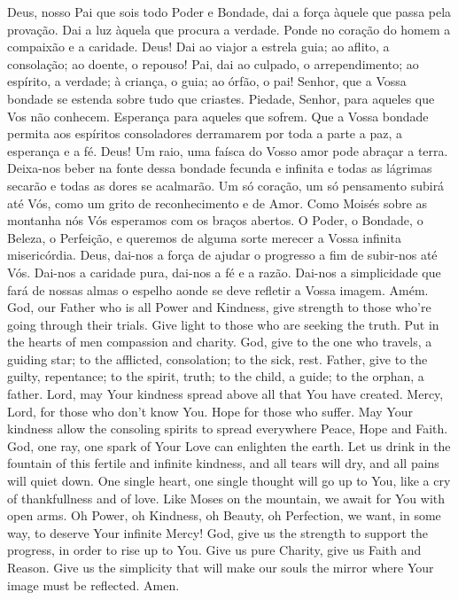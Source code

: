 \scleardpage
{}
  \beginverse
    Deus, nosso Pai que sois todo Poder e Bondade, dai
    a força àquele que passa pela provação.
    \ind Dai a luz àquela que procura a verdade.
    \ind Ponde no coração do homem a compaixão e a caridade.
    \ind Deus! Dai ao viajor a estrela guia; ao aflito,
    a consolação; ao doente, o repouso!
    \ind Pai, dai ao culpado, o arrependimento; ao espírito,
    a verdade; à criança, o guia; ao órfão, o pai!
    \ind Senhor, que a Vossa bondade se estenda sobre tudo
    que criastes.
    \ind Piedade, Senhor, para aqueles que Vos não conhecem.
    \ind Esperança para aqueles que sofrem.
    \ind Que a Vossa bondade permita aos espíritos
    consoladores derramarem por toda a parte a paz, a
    esperança e a fé.
    \ind Deus! Um raio, uma faísca do Vosso amor pode abraçar
    a terra.
    \ind Deixa-nos beber na fonte dessa bondade fecunda
    e infinita e todas as lágrimas secarão e todas as
    dores se acalmarão.
    \ind Um só coração, um só pensamento subirá até Vós,
    como um grito de reconhecimento e de Amor.
    \ind Como Moisés sobre as montanha nós Vós esperamos
    com os braços abertos.
    \ind O Poder, o Bondade, o Beleza, o Perfeição, e
    queremos de alguma sorte merecer a Vossa infinita
    misericórdia.
    \ind Deus, dai-nos a força de ajudar o progresso a fim
    de subir-nos até Vós.
    \ind Dai-nos a caridade pura, dai-nos a fé e a razão.
    \ind Dai-nos a simplicidade que fará de nossas almas o
    espelho aonde se deve refletir a Vossa imagem.
    \parspace
    Amém.
  \endverse
  \brk
  \beginverse
    God, our Father who is all Power and Kindness,
    give strength to those who're going through
    their trials.
    \ind Give light to those who are seeking the truth.
    \ind Put in the hearts of men compassion and charity.
    \ind God, give to the one who travels, a guiding star;
    to the afflicted, consolation; to the sick, rest.
    \ind Father, give to the guilty, repentance; to the
    spirit, truth; to the child, a guide; to the orphan,
    a father.
    \ind Lord, may Your kindness spread above all that You
    have created.
    \ind Mercy, Lord, for those who don't know You.
    \ind Hope for those who suffer.
    \ind May Your kindness allow the consoling spirits to
    spread everywhere Peace, Hope and Faith.
    \ind God, one ray, one spark of Your Love can enlighten
    the earth.
    \ind Let us drink in the fountain of this fertile and
    infinite kindness, and all tears will dry, and all pains
    will quiet down.
    \ind One single heart, one single thought will go up to
    You, like a cry of thankfullness and of love.
    \ind Like Moses on the mountain, we await for You with
    open arms.
    \ind Oh Power, oh Kindness, oh Beauty, oh Perfection,
    we want, in some way, to deserve Your infinite Mercy!
    \ind God, give us the strength to support the progress,
    in order to rise up to You.
    \ind Give us pure Charity, give us Faith and Reason.
    \ind Give us the simplicity that will make our souls the
    mirror where Your image must be reflected.
    \parspace
    Amen.
  \endverse
\endsong


